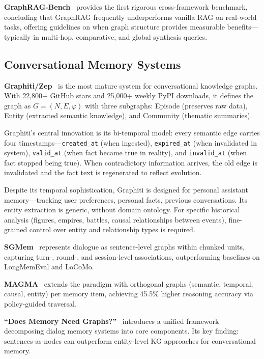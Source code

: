 \textbf{GraphRAG-Bench}~\cite{xiang2026graphragbench} provides the first rigorous cross-framework benchmark, concluding that GraphRAG frequently underperforms vanilla RAG on real-world tasks, offering guidelines on when graph structure provides measurable benefits---typically in multi-hop, comparative, and global synthesis queries.

\subsection{Conversational Memory Systems}

\textbf{Graphiti/Zep}~\cite{rasmussen2025graphiti} is the most mature system for conversational knowledge graphs. With 22,800+ GitHub stars and 25,000+ weekly PyPI downloads, it defines the graph as $G = (N, E, \varphi)$ with three subgraphs: Episode (preserves raw data), Entity (extracted semantic knowledge), and Community (thematic summaries).

Graphiti's central innovation is its bi-temporal model: every semantic edge carries four timestamps---\texttt{created\_at} (when ingested), \texttt{expired\_at} (when invalidated in system), \texttt{valid\_at} (when fact became true in reality), and \texttt{invalid\_at} (when fact stopped being true). When contradictory information arrives, the old edge is invalidated and the fact text is regenerated to reflect evolution.

Despite its temporal sophistication, Graphiti is designed for personal assistant memory---tracking user preferences, personal facts, previous conversations. Its entity extraction is generic, without domain ontology. For specific historical analysis (figures, empires, battles, causal relationships between events), fine-grained control over entity and relationship types is required.

\textbf{SGMem}~\cite{wu2025sgmem} represents dialogue as sentence-level graphs within chunked units, capturing turn-, round-, and session-level associations, outperforming baselines on LongMemEval and LoCoMo.

\textbf{MAGMA}~\cite{jiang2026magma} extends the paradigm with orthogonal graphs (semantic, temporal, causal, entity) per memory item, achieving 45.5\% higher reasoning accuracy via policy-guided traversal.

\textbf{``Does Memory Need Graphs?''}~\cite{hu2026memorygraphs} introduces a unified framework decomposing dialog memory systems into core components. Its key finding: sentences-as-nodes can outperform entity-level KG approaches for conversational memory.

